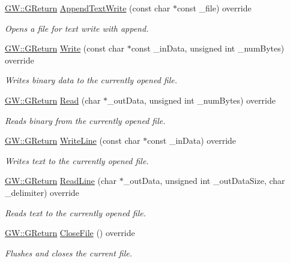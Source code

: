 \begin{DoxyCompactItemize}
\hyperlink{namespaceGW_a67a839e3df7ea8a5c5686613a7a3de21}{G\+W\+::\+G\+Return} \hyperlink{classFileIO_afd4e0d14b85d8c0aded66bd946c291f4}{Append\+Text\+Write} (const char $\ast$const \+\_\+file) override
\begin{DoxyCompactList}\small\item\em Opens a file for text write with append. \end{DoxyCompactList}\item 
\hyperlink{namespaceGW_a67a839e3df7ea8a5c5686613a7a3de21}{G\+W\+::\+G\+Return} \hyperlink{classFileIO_a6d849348b4255304b9a1c0c2bd4cd231}{Write} (const char $\ast$const \+\_\+in\+Data, unsigned int \+\_\+num\+Bytes) override
\begin{DoxyCompactList}\small\item\em Writes binary data to the currently opened file. \end{DoxyCompactList}\item 
\hyperlink{namespaceGW_a67a839e3df7ea8a5c5686613a7a3de21}{G\+W\+::\+G\+Return} \hyperlink{classFileIO_adb5270ace70c0189525a7c21c5be31b9}{Read} (char $\ast$\+\_\+out\+Data, unsigned int \+\_\+num\+Bytes) override
\begin{DoxyCompactList}\small\item\em Reads binary from the currently opened file. \end{DoxyCompactList}\item 
\hyperlink{namespaceGW_a67a839e3df7ea8a5c5686613a7a3de21}{G\+W\+::\+G\+Return} \hyperlink{classFileIO_af76c68078333756f887d7298fe9c3492}{Write\+Line} (const char $\ast$const \+\_\+in\+Data) override
\begin{DoxyCompactList}\small\item\em Writes text to the currently opened file. \end{DoxyCompactList}\item 
\hyperlink{namespaceGW_a67a839e3df7ea8a5c5686613a7a3de21}{G\+W\+::\+G\+Return} \hyperlink{classFileIO_a2178a711eb984539cefe6d651a7167fb}{Read\+Line} (char $\ast$\+\_\+out\+Data, unsigned int \+\_\+out\+Data\+Size, char \+\_\+delimiter) override
\begin{DoxyCompactList}\small\item\em Reads text to the currently opened file. \end{DoxyCompactList}\item 
\hyperlink{namespaceGW_a67a839e3df7ea8a5c5686613a7a3de21}{G\+W\+::\+G\+Return} \hyperlink{classFileIO_a906610c8653ba8ca476dc46679851590}{Close\+File} () override
\begin{DoxyCompactList}\small\item\em Flushes and closes the current file. \end{DoxyCompactList}\item 

\end{DoxyCompactItemize}
